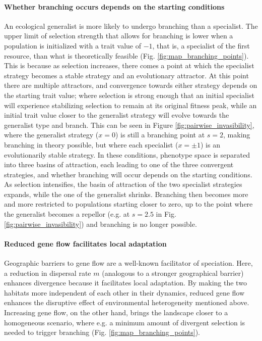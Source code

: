
\paragraph{Whether branching occurs depends on the starting conditions} An ecological generalist is more likely to undergo branching than a specialist. The upper limit of selection strength that allows for branching is lower when a population is initialized with a trait value of $-1$, that is, a specialist of the first resource, than what is theoretically feasible (Fig. \ref{fig:map_branching_points}). This is because as selection increases, there comes a point at which the specialist strategy becomes a stable strategy and an evolutionary attractor. At this point there are multiple attractors, and convergence towards either strategy depends on the starting trait value; where selection is strong enough that an initial specialist will experience stabilizing selection to remain at its original fitness peak, while an initial trait value closer to the generalist strategy will evolve towards the generalist type and branch. This can be seen in Figure \ref{fig:pairwise_invasibility}, where the generalist strategy ($x = 0$) is still a branching point at $s = 2$, making branching in theory possible, but where each specialist ($x = \pm 1$) is an evolutionarily stable strategy. In these conditions, phenotype space is separated into three basins of attraction, each leading to one of the three convergent strategies, and whether branching will occur depends on the starting conditions. As selection intensifies, the basin of attraction of the two specialist strategies expands, while the one of the generalist shrinks. Branching then becomes more and more restricted to populations starting closer to zero, up to the point where the generalist becomes a repellor (e.g. at $s = 2.5$ in Fig. \ref{fig:pairwise_invasibility}) and branching is no longer possible.\\


\paragraph{Reduced gene flow facilitates local adaptation} Geographic barriers to gene flow are a well-known facilitator of speciation. Here, a reduction in dispersal rate $m$ (analogous to a stronger geographical barrier) enhances divergence because it facilitates local adaptation. By making the two habitats more independent of each other in their dynamics, reduced gene flow enhances the disruptive effect of environmental heterogeneity mentioned above. Increasing gene flow, on the other hand, brings the landscape closer to a homogeneous scenario, where e.g. a minimum amount of divergent selection is needed to trigger branching (Fig. \ref{fig:map_branching_points}).\\

